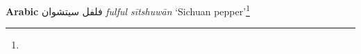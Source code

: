 \begin{etymology}\label{ety:fulful sitshuwan}
\textbf{Arabic} {فلفل سيتشوان} \textit{fulful sītshuwān} `Sichuan pepper'\footnote{}
\end{etymology}